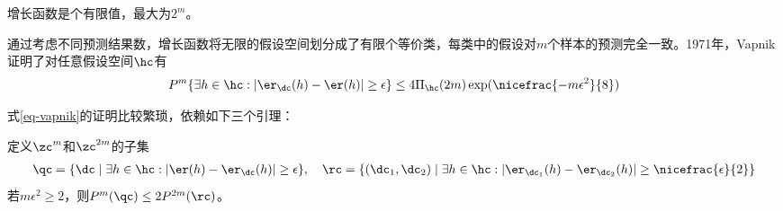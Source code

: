 \documentclass{ctexart}
\begin{document}
\begin{remark}
    增长函数是个有限值，最大为$2^m$。
\end{remark}

通过考虑不同预测结果数，增长函数将无限的假设空间划分成了有限个等价类，每类中的假设对$m$个样本的预测完全一致。1971年，Vapnik证明了对任意假设空间$\hc$有
\begin{align} \label{eq-vapnik}
    P^m \{ \exists h \in \hc: |\er_\dc (h) - \er (h)| \ge \epsilon \} \le 4 \Pi_\hc (2m) \exp ( \nicefrac{-m \epsilon^2}{8} )
\end{align}

式\eqref{eq-vapnik}的证明比较繁琐，依赖如下三个引理：

\begin{lemma} \label{lem-vapnik-1}
    定义$\zc^m$和$\zc^{2m}$的子集
    \begin{align*}
        \qc = \{ \dc \mid \exists h \in \hc: |\er(h) - \er_\dc(h)| \ge \epsilon \}, \quad \rc = \{ (\dc_1, \dc_2) \mid \exists h \in \hc: |\er_{\dc_1} (h) - \er_{\dc_2} (h)| \ge \nicefrac{\epsilon}{2} \}
    \end{align*}
    若$m \epsilon^2 \ge 2$，则$P^m (\qc) \le 2 P^{2m} (\rc)$。
\end{lemma}
\end{document}
